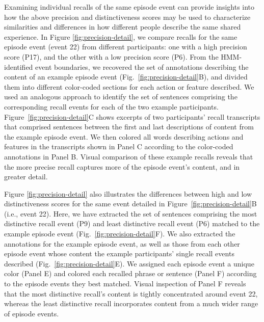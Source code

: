 \documentclass[10pt]{article}
\begin{document}
Examining individual recalls of the same episode event can provide insights into how the above precision and distinctiveness scores may be used to characterize similarities and differences in how different people describe the same shared experience.  In Figure \ref{fig:precision-detail}, we compare recalls for the same episode event (event 22) from different participants: one with a high precision score (P17), and the other with a low precision score (P6).  From the HMM-identified event boundaries, we recovered the set of annotations describing the content of an example episode event (Fig.~\ref{fig:precision-detail}B), and divided them into different color-coded sections for each action or feature described.  We used an analogous approach to identify the set of sentences comprising the corresponding recall events for each of the two example participants.  Figure~\ref{fig:precision-detail}C shows excerpts of two participants' recall transcripts that comprised sentences between the first and last descriptions of content from the example episode event.  We then colored all words describing actions and features in the transcripts shown in Panel C according to the color-coded annotations in Panel B.  Visual comparison of these example recalls reveals that the more precise recall captures more of the episode event's content, and in greater detail.

Figure \ref{fig:precision-detail} also illustrates the differences between high and low distinctiveness scores for the same event detailed in Figure~\ref{fig:precision-detail}B (i.e., event 22).  Here, we have extracted the set of sentences comprising the most distinctive recall event (P9) and least distinctive recall event (P6) matched to the example episode event (Fig.~\ref{fig:precision-detail}F).  We also extracted the annotations for the example episode event, as well as those from each other episode event whose content the example participants' single recall events described (Fig.~\ref{fig:precision-detail}E).  We assigned each episode event a unique color (Panel E) and colored each recalled phrase or sentence (Panel F) according to the episode events they best matched.  Visual inspection of Panel F reveals that the most distinctive recall's content is tightly concentrated around event 22, whereas the least distinctive recall incorporates content from a much wider range of episode events.
\end{document}

